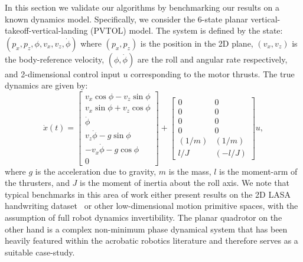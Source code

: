 \documentclass[conference]{svproc}
\begin{document}
In this section we validate our algorithms by benchmarking our results on a known dynamics model. Specifically, we consider the 6-state planar vertical-takeoff-vertical-landing (PVTOL) model. The system is defined by the state: $(p_x,p_z,\phi,v_x,v_z,\dot{\phi})$ where $(p_x,p_z)$ is the position in the 2D plane, $(v_x,v_z)$ is the body-reference velocity, $(\phi,\dot{\phi})$ are the roll and angular rate respectively, and 2-dimensional control input $u$ corresponding to the motor thrusts. The true dynamics are given by:
\[
    \dot{x}(t) = \begin{bmatrix} v_x \cos\phi - v_z \sin\phi \\ v_x\sin\phi + v_z\cos\phi \\ \dot{\phi} \\ v_z\dot{\phi} - g\sin\phi \\ -v_x\dot{\phi} - g\cos\phi \\ 0 \end{bmatrix} + \begin{bmatrix} 0&0\\0&0 \\0&0 \\0&0 \\ (1/m) &(1/m) \\ l/J & (-l/J) \end{bmatrix}u,
\]
where $g$ is the acceleration due to gravity, $m$ is the mass, $l$ is the moment-arm of the thrusters, and $J$ is the moment of inertia about the roll axis. 
We note that typical benchmarks in this area of work either present results on the 2D LASA handwriting dataset~\cite{Khansari-ZadehBillard2011} or other low-dimensional motion primitive spaces, with the assumption of full robot dynamics invertibility. The planar quadrotor on the other hand is a complex non-minimum phase dynamical system that has been heavily featured within the acrobatic robotics literature and therefore serves as a suitable case-study. 

\end{document}

